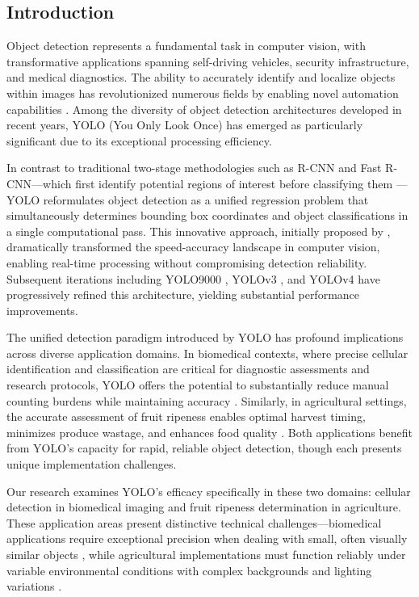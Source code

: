 \begin{multicols}{2}
\section{Introduction}
Object detection represents a fundamental task in computer vision, with transformative applications spanning self-driving vehicles, security infrastructure, and medical diagnostics. The ability to accurately identify and localize objects within images has revolutionized numerous fields by enabling novel automation capabilities \citep{8627998}. Among the diversity of object detection architectures developed in recent years, YOLO (You Only Look Once) has emerged as particularly significant due to its exceptional processing efficiency.

In contrast to traditional two-stage methodologies such as R-CNN and Fast R-CNN—which first identify potential regions of interest before classifying them \citep{7410526}—YOLO reformulates object detection as a unified regression problem that simultaneously determines bounding box coordinates and object classifications in a single computational pass. This innovative approach, initially proposed by \citet{redmon2016lookonceunifiedrealtime}, dramatically transformed the speed-accuracy landscape in computer vision, enabling real-time processing without compromising detection reliability. Subsequent iterations including YOLO9000 \citep{8100173}, YOLOv3 \citep{redmon2018yolov3}, and YOLOv4 \citep{bochkovskiy2020yolov4} have progressively refined this architecture, yielding substantial performance improvements.

The unified detection paradigm introduced by YOLO has profound implications across diverse application domains. In biomedical contexts, where precise cellular identification and classification are critical for diagnostic assessments and research protocols, YOLO offers the potential to substantially reduce manual counting burdens while maintaining accuracy \citep{Chan2020}. Similarly, in agricultural settings, the accurate assessment of fruit ripeness enables optimal harvest timing, minimizes produce wastage, and enhances food quality \citep{Koirala2019}. Both applications benefit from YOLO's capacity for rapid, reliable object detection, though each presents unique implementation challenges.

Our research examines YOLO's efficacy specifically in these two domains: cellular detection in biomedical imaging and fruit ripeness determination in agriculture. These application areas present distinctive technical challenges—biomedical applications require exceptional precision when dealing with small, often visually similar objects \citep{electronics8030292}, while agricultural implementations must function reliably under variable environmental conditions with complex backgrounds and lighting variations \citep{KAMILARIS201870}.


\end{multicols}
